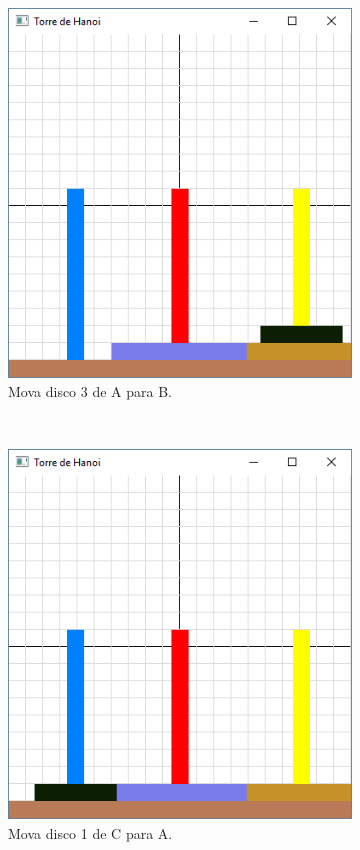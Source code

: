 \begin{figure}[H]
\begin{subfigure}[t]{.25\textwidth}
    \includegraphics[scale=0.3]{img/hanoi_4e}
    \caption{Mova disco 3 de A para B.} 
  \end{subfigure}
  ~
  \begin{subfigure}[t]{.25\textwidth}
    \includegraphics[scale=0.3]{img/hanoi_4f}
    \caption{Mova disco 1 de C para A.} 
  \end{subfigure}
  ~
  \begin{subfigure}[t]{.25\textwidth}

\end{subfigure}
\end{figure}
